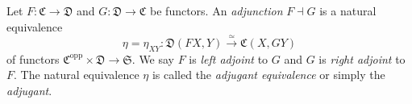 Let $F : \mathfrak{C} \to \mathfrak{D}$ and $G : \mathfrak{D} \to \mathfrak{C}$ be functors. An \textit{adjunction} $F \dashv G$ is a natural equivalence
$$
\eta = \eta_{XY} : \mathfrak{D}(FX, Y) \overset{\simeq}{\longrightarrow} \mathfrak{C}(X, GY)
$$
of functors $\mathfrak{C}^{\text{opp}} \times \mathfrak{D} \to \mathfrak{S}$. We say $F$ is \textit{left adjoint} to $G$ and $G$ is \textit{right adjoint} to $F$. The natural equivalence $\eta$ is called the \textit{adjugant equivalence} or simply the \textit{adjugant}.
